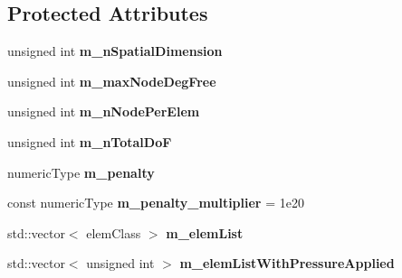 \subsection*{Protected Attributes}
\begin{DoxyCompactItemize}
\item 
\mbox{\label{classbase_structural_analysis_class_a58fc392e34ba87cc9dff3a0901127faa}} 
unsigned int {\bfseries m\+\_\+n\+Spatial\+Dimension}
\item 
\mbox{\label{classbase_structural_analysis_class_af7ea30f9a3e3c353eeaba07c31c445a0}} 
unsigned int {\bfseries m\+\_\+max\+Node\+Deg\+Free}
\item 
\mbox{\label{classbase_structural_analysis_class_aed50959156544fc3d15af79eb38d6ae0}} 
unsigned int {\bfseries m\+\_\+n\+Node\+Per\+Elem}
\item 
\mbox{\label{classbase_structural_analysis_class_a9c1dbd7cb8a65f514211505672854330}} 
unsigned int {\bfseries m\+\_\+n\+Total\+DoF}
\item 
\mbox{\label{classbase_structural_analysis_class_a7e59de3567f891a9e6ea32378f0d7435}} 
numeric\+Type {\bfseries m\+\_\+penalty}
\item 
\mbox{\label{classbase_structural_analysis_class_a5366e9b75e98f8360ac90c72ea121dcd}} 
const numeric\+Type {\bfseries m\+\_\+penalty\+\_\+multiplier} = 1e20
\item 
\mbox{\label{classbase_structural_analysis_class_a80ad4a3ce359b44670321a7d4cefef58}} 
std\+::vector$<$ elem\+Class $>$ {\bfseries m\+\_\+elem\+List}
\item 
\mbox{\label{classbase_structural_analysis_class_a53cf915dc1fc9fcb8ff58b20bfac5632}} 
std\+::vector$<$ unsigned int $>$ {\bfseries m\+\_\+elem\+List\+With\+Pressure\+Applied}
\item 
\mbox{\label{classbase_structural_analysis_class_a1007e2a6feb183e4f2aa79cc44eb9bd1}} 

\end{DoxyCompactItemize}
